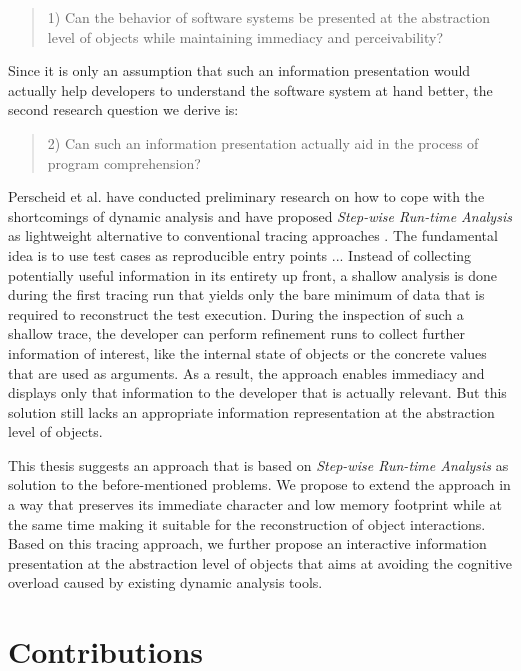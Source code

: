 \begin{quote}
1) Can the behavior of software systems be presented at the abstraction level of objects while maintaining immediacy and perceivability?
\end{quote}

Since it is only an assumption that such an information presentation would actually help developers to understand the software system at hand better, the second research question we derive is:

\begin{quote}
2) Can such an information presentation actually aid in the process of program comprehension?
\end{quote}

Perscheid et al. have conducted preliminary research on how to cope with the shortcomings of dynamic analysis and have proposed \emph{Step-wise Run-time Analysis} as lightweight alternative to conventional tracing approaches \cite{perscheid_immediacy_2010}.
The fundamental idea is to use test cases as reproducible entry points ...
Instead of collecting potentially useful information in its entirety up front, a shallow analysis is done during the first tracing run that yields only the bare minimum of data that is required to reconstruct the test execution.
During the inspection of such a shallow trace, the developer can perform refinement runs to collect further information of interest, like the internal state of objects or the concrete values that are used as arguments.
As a result, the approach enables immediacy and displays only that information to the developer that is actually relevant.
But this solution still lacks an appropriate information representation at the abstraction level of objects.

This thesis suggests an approach that is based on \emph{Step-wise Run-time Analysis} as solution to the before-mentioned problems. 
We propose to extend the approach in a way that preserves its immediate character and low memory footprint while at the same time making it suitable for the reconstruction of object interactions.
Based on this tracing approach, we further propose an interactive information presentation at the abstraction level of objects that aims at avoiding the cognitive overload caused by existing dynamic analysis tools.

\section{Contributions}
\label{s:contributions}

